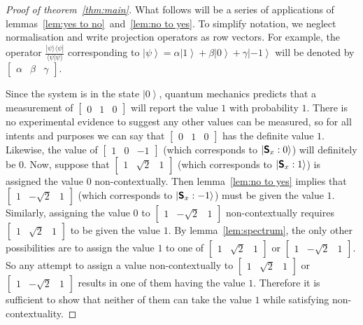 \documentclass[11pt, a4paper]{article}
\theoremstyle{definition}
\newcommand{\ket}[1]{\left| #1 \right>}
\newcommand{\iprod}[2]{\langle #1 | #2 \rangle}
\newcommand{\oprod}[2]{| #1 \rangle\langle #2 |}
\newcommand{\proj}[3]{\begin{smallmatrix} #1 & #2 & #3 \end{smallmatrix}}
\begin{document}
\begin{proof}[Proof of theorem~\ref{thm:main}]
What follows will be a series of applications of lemmas~\ref{lem:yes to no}~and~\ref{lem:no to yes}.
To simplify notation, we neglect normalisation and write projection operators as row vectors.
For example, the operator $\frac{\oprod{\psi}{\psi}}{\iprod{\psi}{\psi}}$ corresponding to $\ket{\psi} = \alpha \ket{1} + \beta \ket{0} + \gamma \ket{-1}$ will be denoted by $\left[\proj{\alpha}{\beta}{\gamma}\right]$.

Since the system is in the state $\ket{0}$, quantum mechanics predicts that a measurement of $\left[\proj{0}{1}{0}\right]$ will report the value $1$ with probability $1$.
There is no experimental evidence to suggest any other values can be measured, so for all intents and purposes we can say that $\left[\proj{0}{1}{0}\right]$ has the definite value $1$.
Likewise, the value of $\left[\proj{1}{0}{-1}\right]$ (which corresponds to $\ket{\textsf{\textbf{S}}_x : 0}$) will definitely be $0$.
Now, suppose that $\left[\proj{1}{\sqrt{2}}{1}\right]$ (which corresponds to $\ket{\textsf{\textbf{S}}_x : 1}$) is assigned the value $0$ non-contextually.
Then lemma~\ref{lem:no to yes} implies that $\left[\proj{1}{-\sqrt{2}}{1}\right]$ (which corresponds to $\ket{\textsf{\textbf{S}}_x : -1}$) must be given the value $1$.
Similarly, assigning the value $0$ to $\left[\proj{1}{-\sqrt{2}}{1}\right]$ non-contextually requires $\left[\proj{1}{\sqrt{2}}{1}\right]$ to be given the value $1$.
By lemma~\ref{lem:spectrum}, the only other possibilities are to assign the value $1$ to one of $\left[\proj{1}{\sqrt{2}}{1}\right]$ or $\left[\proj{1}{-\sqrt{2}}{1}\right]$.
So any attempt to assign a value non-contextually to $\left[\proj{1}{\sqrt{2}}{1}\right]$ or $\left[\proj{1}{-\sqrt{2}}{1}\right]$ results in one of them having the value $1$.
Therefore it is sufficient to show that neither of them can take the value $1$ while satisfying non-contextuality.


\end{proof}
\end{document}
